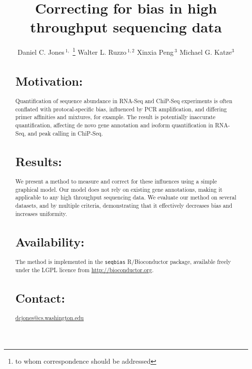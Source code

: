 \documentclass{bioinfo}
\begin{document}

\title{Correcting for bias in high throughput sequencing data}
\author[Jones \textit{et~al}]
{Daniel C. Jones\,$^{1,}$
\footnote{to whom correspondence should be addressed}\hspace{0.5em}
Walter L. Ruzzo\,$^{1,2}$
Xinxia Peng\,$^{3}$
Michael G. Katze$^{3}$
}


\address{
$^{1}$Deportment of Computer Science and Engineering, University of
Washington, Seattle, WA 98195-2350, USA\\
$^{2}$Fred Hutchinson Cancer Research Center, Seattle, WA 98109, USA\\
$^{3}$Department of Microbiology, University of Washington, Seattle, WA
98195-7242, USA}


\maketitle

\begin{abstract}

\section{Motivation:}
Quantification of sequence abundance in RNA-Seq and ChiP-Seq experiments is
often conflated with protocal-specific bias, influenced by PCR amplification,
and differing primer affinities and mixtures, for example. The result is
potentially inaccurate quantification, affecting de novo gene annotation and
isoform quantification in RNA-Seq, and peak calling in ChiP-Seq.


\section{Results:}
We present a method to measure and correct for these influences using a simple
graphical model. Our model does not rely on existing gene annotations, making it
applicable to any high throughput sequencing data. We evaluate our method on
several datasets, and by multiple criteria, demonstrating that it effectively
decreases bias and increases uniformity.


\section{Availability:}
The method is implemented in the \texttt{seqbias} R/Bioconductor package,
available freely under the LGPL licence from
\href{http://bioconductor.org}{http://bioconductor.org}.


\section{Contact:}
\href{dcjones@cs.washington.edu}{dcjones@cs.washington.edu}

\end{abstract}
\end{document}
